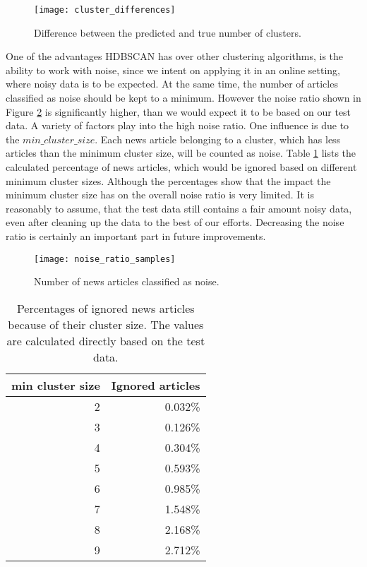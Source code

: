 \begin{figure}[h]
    \centering
    \texttt{[image: cluster\_differences]}
    \caption{Difference between the predicted and true number of clusters.}
    \label{fig:cluster_differences}
\end{figure}

One of the advantages HDBSCAN has over other clustering algorithms,
is the ability to work with noise, since we intent on applying it in an online setting,
where noisy data is to be expected.
At the same time, the number of articles classified as noise should be kept to a minimum.
However the noise ratio shown in Figure \ref{fig:noise_ratio_samples} is significantly higher,
than we would expect it to be based on our test data.
A variety of factors play into the high noise ratio.
One influence is due to the $min\_cluster\_size$.
Each news article belonging to a cluster, which has less articles than the minimum cluster size, will be counted as noise.
Table \ref{tab:expected_noise} lists the calculated percentage of news articles,
which would be ignored based on different minimum cluster sizes.
Although the percentages show that the impact the minimum cluster size has on the overall noise ratio is very limited.
It is reasonably to assume, that the test data still contains a fair amount noisy data,
even after cleaning up the data to the best of our efforts.
Decreasing the noise ratio is certainly an important part in future improvements.

\begin{figure}[h]
    \centering
    \texttt{[image: noise\_ratio\_samples]}
    \caption{Number of news articles classified as noise.}
    \label{fig:noise_ratio_samples}
\end{figure}

\begin{table}[h]
    \centering
    \begin{tabular}{|r|r|}
        \hline
        \textbf{min cluster size} & \textbf{Ignored articles} \\
        \hline
        2 & 0.032\% \\ \hline
        3 & 0.126\% \\ \hline
        4 & 0.304\% \\ \hline
        5 & 0.593\% \\ \hline
        6 & 0.985\% \\ \hline
        7 & 1.548\% \\ \hline
        8 & 2.168\% \\ \hline
        9 & 2.712\% \\ \hline
    \end{tabular}
    \caption{Percentages of ignored news articles because of their cluster size. The values are calculated directly based on the test data.}
    \label{tab:expected_noise}
\end{table}

